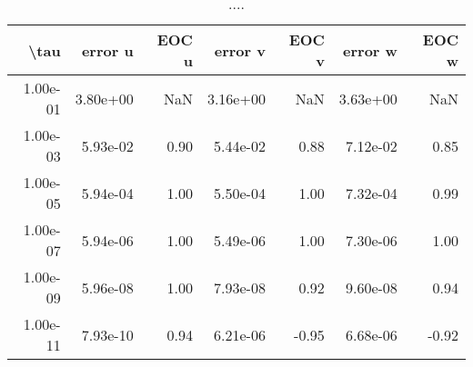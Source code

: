 \begin{table}[ht]
\centering
\begin{tabular}{rrrrrrr}
  \hline
  \textbf{\textbackslash{}tau} & \textbf{error u} & \textbf{EOC u} & \textbf{error v} & \textbf{EOC v} & \textbf{error w} & \textbf{EOC w} \\\hline
  1.00e-01 & 3.80e+00 & NaN & 3.16e+00 & NaN & 3.63e+00 & NaN \\
  1.00e-03 & 5.93e-02 & 0.90 & 5.44e-02 & 0.88 & 7.12e-02 & 0.85 \\
  1.00e-05 & 5.94e-04 & 1.00 & 5.50e-04 & 1.00 & 7.32e-04 & 0.99 \\
  1.00e-07 & 5.94e-06 & 1.00 & 5.49e-06 & 1.00 & 7.30e-06 & 1.00 \\
  1.00e-09 & 5.96e-08 & 1.00 & 7.93e-08 & 0.92 & 9.60e-08 & 0.94 \\
  1.00e-11 & 7.93e-10 & 0.94 & 6.21e-06 & -0.95 & 6.68e-06 & -0.92 \\\hline
\end{tabular}
\caption{....}
\end{table}
